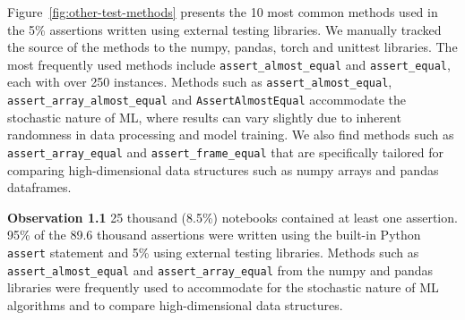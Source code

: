 \documentclass[smallextended]{svjour3}       %
\newcommand{\highlight}[1]{\begin{framed}%
  \noindent#1
\end{framed}}
\providecommand{\DIFaddbegin}{} %
\providecommand{\DIFaddend}{} %
\providecommand{\DIFdelbegin}{} %
\providecommand{\DIFdelend}{} %
\newcommand{\DIFscaledelfig}{0.5}
\newlength{\DIFdelgraphicswidth} %
\newlength{\DIFdelgraphicsheight} %
\newcommand{\DIFaddincludegraphics}[2][]{{\color{blue}\fbox{\DIFOincludegraphics[#1]{#2}}}} %
\newcommand{\DIFdelincludegraphics}[2][]{%
\sbox{\DIFdelgraphicsbox}{\DIFOincludegraphics[#1]{#2}}%
\settoboxwidth{\DIFdelgraphicswidth}{\DIFdelgraphicsbox} %
\settoboxtotalheight{\DIFdelgraphicsheight}{\DIFdelgraphicsbox} %
\scalebox{\DIFscaledelfig}{%
\parbox[b]{\DIFdelgraphicswidth}{\usebox{\DIFdelgraphicsbox}\\[-\baselineskip] \rule{\DIFdelgraphicswidth}{0em}}\llap{\resizebox{\DIFdelgraphicswidth}{\DIFdelgraphicsheight}{%
\setlength{\unitlength}{\DIFdelgraphicswidth}%
\begin{picture}(1,1)%
\thicklines\linethickness{2pt} %
{\color[rgb]{1,0,0}\put(0,0){\framebox(1,1){}}}%
{\color[rgb]{1,0,0}\put(0,0){\line( 1,1){1}}}%
{\color[rgb]{1,0,0}\put(0,1){\line(1,-1){1}}}%
\end{picture}%
}\hspace*{3pt}}} %
} %
\DeclareRobustCommand{\DIFaddbegin}{\DIFOaddbegin \let\includegraphics\DIFaddincludegraphics} %
\DeclareRobustCommand{\DIFaddend}{\DIFOaddend \let\includegraphics\DIFOincludegraphics} %
\DeclareRobustCommand{\DIFdelbegin}{\DIFOdelbegin \let\includegraphics\DIFdelincludegraphics} %
\DeclareRobustCommand{\DIFdelend}{\DIFOaddend \let\includegraphics\DIFOincludegraphics} %
\begin{document}
Figure~\ref{fig:other-test-methods} presents the 10 most common methods used in the 5\% assertions written using external testing libraries. We manually tracked the source of the methods to the numpy, pandas, torch and unittest libraries. The most frequently used methods include \lstinline{assert_almost_equal} and \lstinline{assert_equal}, each with over 250 instances. Methods such as \lstinline{assert_almost_equal}, \lstinline{assert_array_almost_equal} and \lstinline{AssertAlmostEqual} accommodate the stochastic nature of ML, where results can vary slightly due to inherent randomness in data processing and model training. We also find methods such as \lstinline{assert_array_equal} and \lstinline{assert_frame_equal} that are specifically tailored for comparing high-dimensional data structures such as numpy arrays and pandas dataframes.

\DIFdelbegin %
\DIFdelend \DIFaddbegin \highlight{\textbf{Observation 1.1} 25 thousand (8.5\%) notebooks contained at least one assertion. 95\% of the 89.6 thousand assertions were written using the built-in Python {\color{blue}%
\lstinline{assert} %
}%
statement and 5\% using external testing libraries. Methods such as {\color{blue}%
\lstinline{assert_almost_equal} %
}%
and {\color{blue}%
\lstinline{assert_array_equal} %
}%
from the numpy and pandas libraries were frequently used to accommodate for the stochastic nature of ML algorithms and to compare high-dimensional data structures.}
\DIFaddend 
\end{document}
